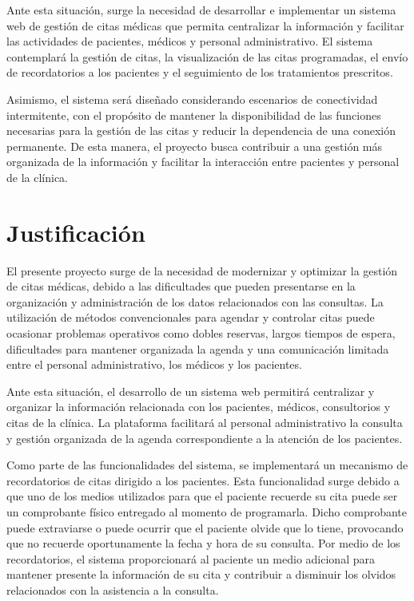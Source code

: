 Ante esta situación, surge la necesidad de desarrollar e implementar un sistema web de gestión de citas médicas que permita centralizar la información y facilitar las actividades de pacientes, médicos y personal administrativo. El sistema contemplará la gestión de citas, la visualización de las citas programadas, el envío de recordatorios a los pacientes y el seguimiento de los tratamientos prescritos.

Asimismo, el sistema será diseñado considerando escenarios de conectividad intermitente, con el propósito de mantener la disponibilidad de las funciones necesarias para la gestión de las citas y reducir la dependencia de una conexión permanente. De esta manera, el proyecto busca contribuir a una gestión más organizada de la información y facilitar la interacción entre pacientes y personal de la clínica.

\section{Justificación}

El presente proyecto surge de la necesidad de modernizar y optimizar la gestión de citas médicas, debido a las dificultades que pueden presentarse en la organización y administración de los datos relacionados con las consultas. La utilización de métodos convencionales para agendar y controlar citas puede ocasionar problemas operativos como dobles reservas, largos tiempos de espera, dificultades para mantener organizada la agenda y una comunicación limitada entre el personal administrativo, los médicos y los pacientes.

Ante esta situación, el desarrollo de un sistema web permitirá centralizar y organizar la información relacionada con los pacientes, médicos, consultorios y citas de la clínica. La plataforma facilitará al personal administrativo la consulta y gestión organizada de la agenda correspondiente a la atención de los pacientes.

Como parte de las funcionalidades del sistema, se implementará un mecanismo de recordatorios de citas dirigido a los pacientes. Esta funcionalidad surge debido a que uno de los medios utilizados para que el paciente recuerde su cita puede ser un comprobante físico entregado al momento de programarla. Dicho comprobante puede extraviarse o puede ocurrir que el paciente olvide que lo tiene, provocando que no recuerde oportunamente la fecha y hora de su consulta. Por medio de los recordatorios, el sistema proporcionará al paciente un medio adicional para mantener presente la información de su cita y contribuir a disminuir los olvidos relacionados con la asistencia a la consulta.

